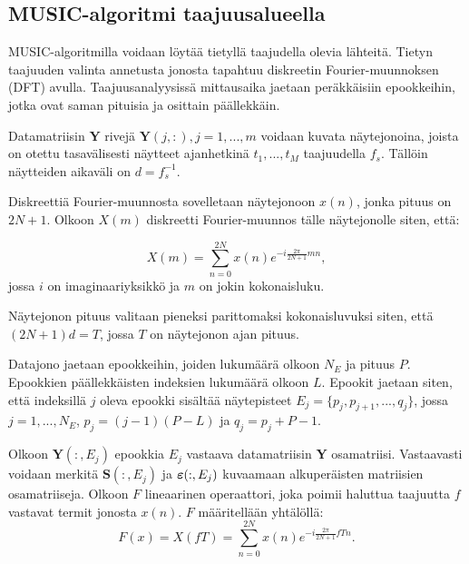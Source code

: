 \subsection{MUSIC-algoritmi taajuusalueella}

MUSIC-algoritmilla voidaan löytää tietyllä taajudella olevia lähteitä. Tietyn taajuuden valinta annetusta jonosta tapahtuu diskreetin Fourier-muunnoksen (DFT) avulla. Taajuusanalyysissä mittausaika jaetaan peräkkäisiin epookkeihin, jotka ovat saman pituisia ja osittain päällekkäin.

Datamatriisin \textbf{Y} rivejä $\mathbf{Y}(j,:), j=1,...,m$ voidaan kuvata näytejonoina, joista on otettu tasavälisesti näytteet ajanhetkinä $t_1,...,t_M$ taajuudella $f_s$. Tällöin näytteiden aikaväli on $d = f_s^{-1}$.

Diskreettiä Fourier-muunnosta sovelletaan näytejonoon $x(n)$, jonka pituus on $2N+1$. Olkoon $X(m)$ diskreetti Fourier-muunnos tälle näytejonolle siten, että:

\begin{equation}
    X(m) = \sum_{n=0}^{2N}x(n)e^{-i\frac{2\pi}{2N+1}mn},
\end{equation}
jossa $i$ on imaginaariyksikkö ja $m$ on jokin kokonaisluku.

Näytejonon pituus valitaan pieneksi parittomaksi kokonaisluvuksi siten, että $(2N+1)d = T$, jossa $T$ on näytejonon ajan pituus.

Datajono jaetaan epookkeihin, joiden lukumäärä olkoon $N_E$ ja pituus $P$. Epookkien päällekkäisten indeksien lukumäärä olkoon $L$. Epookit jaetaan siten, että indeksillä $j$ oleva epookki sisältää näytepisteet $E_j = \{p_j,p_{j+1},...,q_j\}$, jossa $j=1,...,N_E$, $p_j = (j-1)(P-L)$ ja $q_j = p_j+P-1$. 

Olkoon $\mathbf{Y}(:,E_j)$ epookkia $E_j$ vastaava datamatriisin \textbf{Y} osamatriisi. Vastaavasti voidaan merkitä $\mathbf{S}(:,E_j)$ ja $\text{\boldmath$\varepsilon$}(:,E_j)$ kuvaamaan alkuperäisten matriisien osamatriiseja. Olkoon $F$ lineaarinen operaattori, joka poimii haluttua taajuutta $f$ vastavat termit jonosta $x(n)$. $F$ määritellään yhtälöllä:
\begin{equation}
    F(x) = X(fT)=\sum_{n=0}^{2N}x(n)e^{-i\frac{2\pi}{2N+1}fTn}.
\end{equation}

